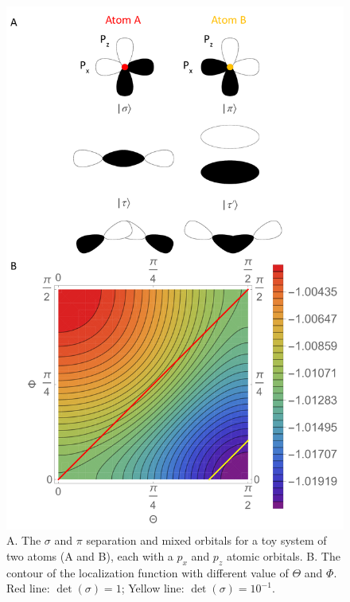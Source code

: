 \documentclass[aps,prl,reprint,amsmath,amssymb]{revtex4-1}
\begin{document}
%
\begin{figure}[hbpt]
\centering
\includegraphics[scale=0.35]{sigma_pi_mixing.pdf}
\caption{A. The $\sigma$ and $\pi$ separation and mixed orbitals for a toy system of two atoms (A and B), each with a $p_x$ and $p_z$ atomic orbitals. B. The contour of the localization function with different value of $\Theta$ and $\Phi$. Red line: $\det(\sigma) = 1$; Yellow line: $\det(\sigma) = 10^{-1}$.}
\label{fig:sigma_pi_mixing}
\end{figure}
%
\end{document}
